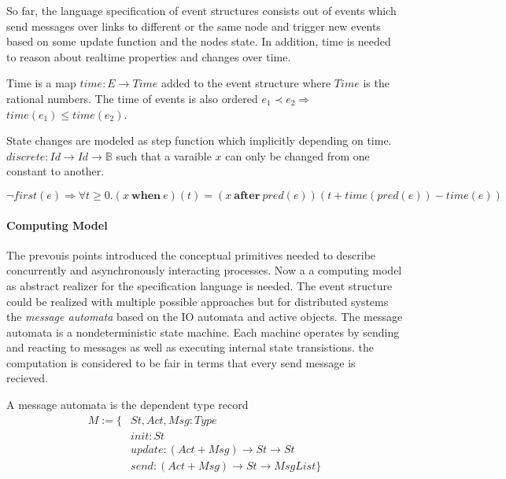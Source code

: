So far, the language specification of event structures consists out of events
which send messages over links to different or the same node and trigger new
events based on some update function and the nodes state. In addition, time
is needed to reason about realtime properties and changes over time.~\cite{bickford2005causal}

\begin{defi}
  Time is a map $time:E\rightarrow Time$ added to the event structure where $Time$
  is the rational numbers. The time of events is also ordered $e_1\prec e_2\Rightarrow$
  $time(e_1)\le time(e_2)$.
\end{defi}

\begin{defi}
  State changes are modeled as step function which implicitly depending on time.
  $discrete:Id\rightarrow Id\rightarrow \mathbb{B}$ such that a varaible $x$ can only be changed
  from one constant to another.
\end{defi}

\begin{axiom}
  $\neg first(e)\Rightarrow \forall t\ge 0.(x\ \textbf{when}\ e)(t)=
  (x\ \textbf{after}\ pred(e))(t+time(pred(e))-time(e))$
\end{axiom}

\paragraph{Computing Model}
The prevouis points introduced the conceptual primitives needed to describe
concurrently and asynchronously interacting processes.
Now a a computing model as abstract realizer for the specification language is needed.
The event structure could be realized with multiple possible approaches but
for distributed systems the \textit{message automata} based on the IO automata
and active objects. The message automata is a nondeterministic state machine.
Each machine operates by sending and reacting to messages as well as
executing internal state transistions.
the computation is considered to be fair in terms that every send message is
recieved.~\cite{bickford2003logic}


\begin{defi}
  A message automata is the dependent type record
  \begin{align*}
    M:=\{ & St,Act,Msg:Type\\
        & init:St\\
        & update:(Act+Msg)\rightarrow St\rightarrow St\\
        & send:(Act+Msg)\rightarrow St\rightarrow MsgList\}
  \end{align*}  
\end{defi}


